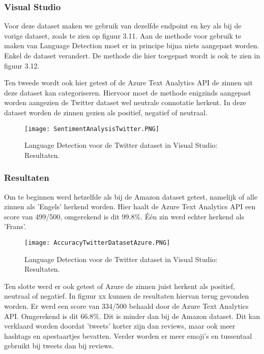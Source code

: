 \subsubsection{Visual Studio}
\label{twitterdatasetvisualstudioazure}
Voor deze dataset maken we gebruik van dezelfde endpoint en key als bij de vorige dataset, zoals te zien op figuur 3.11. Aan de methode voor gebruik te maken van Language Detection moet er in principe bijna niets aangepast worden. Enkel de dataset verandert. De methode die hier toegepast wordt is ook te zien in figuur 3.12.

Ten tweede wordt ook hier getest of de Azure Text Analytics API de zinnen uit deze dataset kan categoriseren. Hiervoor moet de methode enigzinds aangepast worden aangezien de Twitter dataset wel neutrale connotatie herkent. In deze dataset worden de zinnen gezien als positief, negatief of neutraal. 

\begin{figure}[!htbp]
    \texttt{[image: SentimentAnalysisTwitter.PNG]}
    \caption{\label{azuresentimentanalysistwitter}Language Detection voor de Twitter dataset in Visual Studio: Resultaten.}
\end{figure}
\FloatBarrier 


\subsubsection{Resultaten}
\label{twitterdatasetresultatenazure}
Om te beginnen werd hetzelfde als bij de Amazon dataset getest, namelijk of alle zinnen als 'Engels' herkend worden. 
Hier haalt de Azure Text Analytics API een score van 499/500, omgerekend is dit 99.8\%. Één zin werd echter herkend als 'Frans'.

\begin{figure}[!htbp]
    \texttt{[image: AccuracyTwitterDatasetAzure.PNG]}
    \caption{\label{azurelanguagedetectiontwitterresults}Language Detection voor de Twitter dataset in Visual Studio: Resultaten.}
\end{figure}
\FloatBarrier 

Ten slotte werd er ook getest of Azure de zinnen juist herkent als positief, neutraal of negatief. In figuur xx kunnen de resultaten hiervan terug gevonden worden. Er werd een score van 334/500 behaald door de Azure Text Analytics API. Omgerekend is dit 66.8\%. Dit is minder dan bij de Amazon dataset. Dit kan verklaard worden doordat 'tweets' korter zijn dan reviews, maar ook meer hashtags en apestaartjes bevatten. Verder worden er meer emoji's en tussentaal gebruikt bij tweets dan bij reviews.

